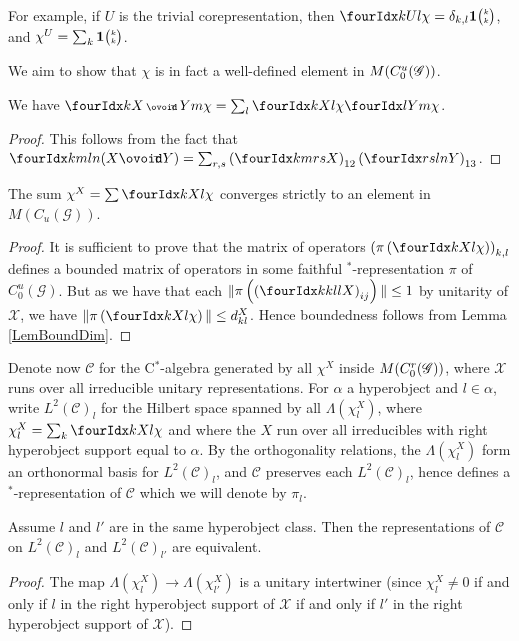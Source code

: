  For example, if $U$ is the trivial corepresentation, then $\Gr{\chi}{}{U}{k}{l} = \delta_{k,l}\UnitC{k}{k}$, and $\chi^U = \sum_k \mathbf{1}{\tiny {\begin{pmatrix} k\\k\end{pmatrix}}}$.
 
 We aim to show that $\chi$ is in fact a well-defined element in $M(C^{u}_{0}(\mathscr{G}))$. 
 
 \begin{Lem} We have $\Gr{\chi}{}{X\smCirct Y}{k}{m}= \sum_l \Gr{\chi}{}{X}{k}{l}\Gr{\chi}{}{Y}{l}{m}$.
 \end{Lem}
 
 \begin{proof} 
 This follows from the fact that $\Gr{(X\Circt Y)}{k}{l}{m}{n} = \sum_{r,s} \left(\Gr{X}{k}{r}{m}{s}\right)_{12} \left(\Gr{Y}{r}{l}{s}{n}\right)_{13}$.
 \end{proof}
 
   
\begin{Lem} The sum $\chi^X  =\sum \Gr{\chi}{}{X}{k}{l}$ converges strictly to an element in $M(C_u(\mathscr{G}))$. 
\end{Lem} 
 
\begin{proof} It is sufficient to prove that the matrix of operators $\left(\pi\left(\Gr{\chi}{}{X}{k}{l}\right)\right)_{k,l}$ defines a bounded matrix of operators in some faithful $^*$-representation $\pi$ of $C^{u}_{0}(\mathscr{G})$. But as we have that each $\|\pi\left(\left(\Gr{X}{k}{l}{k}{l}\right)_{ij}\right)\|\leq 1$ by unitarity of $\mathscr{X}$, we have $\| \pi\left(\Gr{\chi}{}{X}{k}{l}\right)\| \leq d^X_{kl}$.  Hence boundedness follows from Lemma \ref{LemBoundDim}.
\end{proof} 
 
Denote now $\mathcal{C}$ for the C$^*$-algebra generated by all $\chi^X$ inside $M(C^{r}_{0}(\mathscr{G}))$, where $\mathscr{X}$ runs over all irreducible unitary representations. For $\alpha$ a hyperobject and $l\in \alpha$, write  $L^2(\mathcal{C})_l$ for the Hilbert space spanned by all $\Lambda(\chi^X_l)$, where $\chi^X_l = \sum_{k} \Gr{\chi}{}{X}{k}{l}$ and where the $X$ run over all irreducibles with right hyperobject support equal to $\alpha$. By the orthogonality relations, the $\Lambda(\chi^X_l)$ form an orthonormal basis for $L^2(\mathcal{C})_l$, and $\mathcal{C}$ preserves each $L^2(\mathcal{C})_l$, hence defines a $^*$-representation of $\mathcal{C}$ which we will denote by $\pi_l$. 

\begin{Lem}\label{LemEq} Assume $l$ and $l'$ are in the same hyperobject class. Then the representations of $\mathcal{C}$ on $L^2(\mathcal{C})_l$ and $L^2(\mathcal{C})_{l'}$ are equivalent.
\end{Lem} 
\begin{proof} The map $\Lambda(\chi^X_l)\rightarrow \Lambda(\chi^X_{l'})$ is a unitary intertwiner (since $\chi^X_l\neq 0$ if and only if $l$ in the right hyperobject support of $\mathscr{X}$ if and only if $l'$ in the right hyperobject support of $\mathscr{X}$).
\end{proof} 

